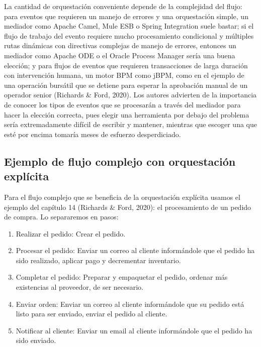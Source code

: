 \documentclass[12pt, a4paper]{article}
\begin{document}
    La cantidad de orquestación conveniente depende de la complejidad del flujo: para eventos que requieren un manejo de errores y una orquestación simple, un mediador como Apache Camel, Mule ESB o Spring Integration suele bastar; si el flujo de trabajo del evento requiere mucho procesamiento condicional y múltiples rutas dinámicas con directivas complejas de manejo de errores, entonces un mediador como Apache ODE o el Oracle Process Manager sería una buena elección; y para flujos de eventos que requieren transacciones de larga duración con intervención humana, un motor BPM como jBPM, como en el ejemplo de una operación bursátil que se detiene para esperar la aprobación manual de un operador senior (Richards \& Ford, 2020). Los autores advierten de la importancia de conocer los tipos de eventos que se procesarán a través del mediador para hacer la elección correcta, pues elegir una herramienta por debajo del problema sería extremadamente difícil de escribir y mantener, mientras que escoger una que esté por encima tomaría meses de esfuerzo desperdiciado.

    \subsection{Ejemplo de flujo complejo con orquestación explícita}

    Para el flujo complejo que se beneficia de la orquestación explícita usamos el ejemplo del capítulo 14 (Richards \& Ford, 2020): el procesamiento de un pedido de compra. Lo separaremos en pasos:

    \begin{enumerate}

        \item Realizar el pedido: Crear el pedido.

        \item Procesar el pedido: Enviar un correo al cliente informándole que el pedido ha sido realizado, aplicar pago y decrementar inventario.

        \item Completar el pedido: Preparar y empaquetar el pedido, ordenar más existencias al proveedor, de ser necesario.

        \item Enviar orden: Enviar un correo al cliente informándole que su pedido está listo para ser enviado, enviar el pedido al cliente.

        \item Notificar al cliente: Enviar un email al cliente informándole que el pedido ha sido enviado.

    \end{enumerate}
\end{document}
